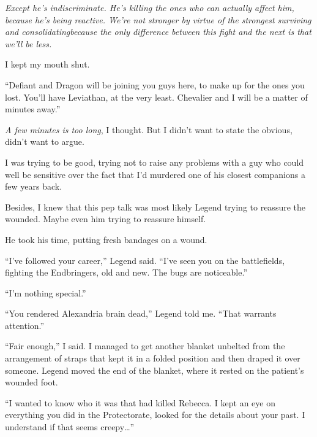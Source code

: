 \emph{Except he's indiscriminate.  He's killing the ones who can actually affect him, because he's being reactive.  We're not stronger by virtue of the strongest surviving and consolidating}\emph{because the only difference between this fight and the next is that we'll be less.}



I kept my mouth shut.



``Defiant and Dragon will be joining you guys here, to make up for the ones you lost.  You'll have Leviathan, at the very least.  Chevalier and I will be a matter of minutes away.''



\emph{A few minutes is too long}, I thought.  But I didn't want to state the obvious, didn't want to argue.



I was trying to be good, trying not to raise any problems with a guy who could well be sensitive over the fact that I'd murdered one of his closest companions a few years back.



Besides, I knew that this pep talk was most likely Legend trying to reassure the wounded.  Maybe even him trying to reassure himself.



He took his time, putting fresh bandages on a wound.



``I've followed your career,'' Legend said.  ``I've seen you on the battlefields, fighting the Endbringers, old and new.  The bugs are noticeable.''



``I'm nothing special.''



``You rendered Alexandria brain dead,'' Legend told me.  ``That warrants attention.''



``Fair enough,'' I said.  I managed to get another blanket unbelted from the arrangement of straps that kept it in a folded position and then draped it over someone.  Legend moved the end of the blanket, where it rested on the patient's wounded foot.



``I wanted to know who it was that had killed Rebecca.  I kept an eye on everything you did in the Protectorate, looked for the details about your past.  I understand if that seems creepy\ldots''



